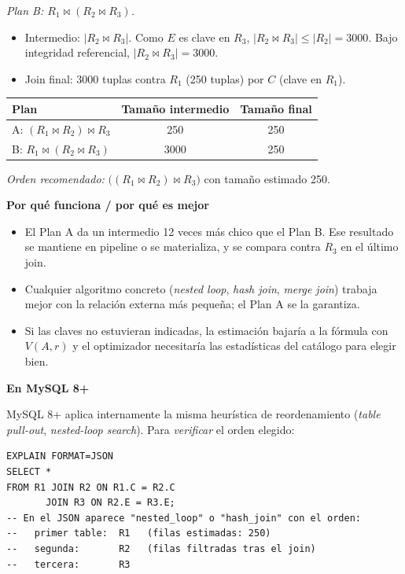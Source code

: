 \documentclass[11pt,a4paper]{article}
\newcommand{\jn}{\bowtie}
\newcommand{\itemcabecera}[1]{\noindent\textbf{#1}\par\medskip}
\newcommand{\bloquePorque}{\itemcabecera{Por qu\'e funciona / por qu\'e es mejor}}
\newcommand{\bloqueMySQL}{\itemcabecera{En MySQL 8+}}
\begin{document}
\textit{Plan B: $R_1 \jn (R_2 \jn R_3)$.}
\begin{itemize}
    \item Intermedio: $|R_2 \jn R_3|$. Como $E$ es clave en $R_3$, $|R_2 \jn R_3| \le |R_2| = 3000$. Bajo integridad referencial, $|R_2 \jn R_3| = 3000$.
    \item Join final: 3000 tuplas contra $R_1$ (250 tuplas) por $C$ (clave en $R_1$).
\end{itemize}

\begin{center}
\begin{tabular}{lcc}
\toprule
Plan & Tamaño intermedio & Tamaño final \\
\midrule
A: $(R_1\jn R_2)\jn R_3$ & 250  & 250 \\
B: $R_1\jn(R_2\jn R_3)$  & 3000 & 250 \\
\bottomrule
\end{tabular}
\end{center}

\textit{Orden recomendado:} $\big((R_1 \jn R_2)\jn R_3\big)$ con tamaño estimado 250.

\bloquePorque

\begin{itemize}
    \item El Plan A da un intermedio 12 veces más chico que el Plan B. Ese resultado se mantiene en pipeline o se materializa, y se compara contra $R_3$ en el último join.
    \item Cualquier algoritmo concreto (\emph{nested loop}, \emph{hash join}, \emph{merge join}) trabaja mejor con la relación externa más pequeña; el Plan A se la garantiza.
    \item Si las claves no estuvieran indicadas, la estimación bajaría a la fórmula con $V(A, r)$ y el optimizador necesitaría las estadísticas del catálogo para elegir bien.
\end{itemize}

\bloqueMySQL

MySQL 8+ aplica internamente la misma heurística de reordenamiento (\emph{table pull-out}, \emph{nested-loop search}). Para \emph{verificar} el orden elegido:

\begin{lstlisting}
EXPLAIN FORMAT=JSON
SELECT *
FROM R1 JOIN R2 ON R1.C = R2.C
       JOIN R3 ON R2.E = R3.E;
-- En el JSON aparece "nested_loop" o "hash_join" con el orden:
--   primer table:  R1   (filas estimadas: 250)
--   segunda:       R2   (filas filtradas tras el join)
--   tercera:       R3
\end{lstlisting}
\end{document}
